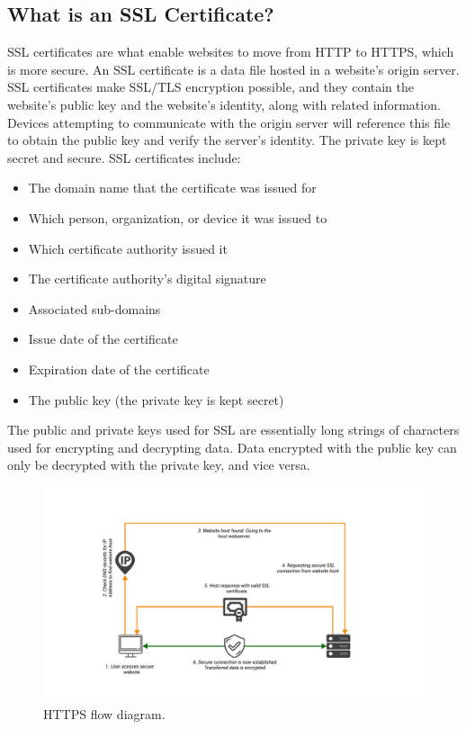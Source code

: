 \subsection{What is an SSL Certificate?}\label{subsec:what-is-an-ssl-certificate?}
SSL certificates are what enable websites to move from HTTP to HTTPS, which is more secure.
An SSL certificate is a data file hosted in a website's origin server.
SSL certificates make SSL/TLS encryption possible, and they contain the website's public key and the website's identity,
along with related information.
Devices attempting to communicate with the origin server will reference this file to obtain the public key and verify
the server's identity.
The private key is kept secret and secure.
SSL certificates include:
\begin{itemize}
    \item The domain name that the certificate was issued for
    \item Which person, organization, or device it was issued to
    \item Which certificate authority issued it
    \item The certificate authority's digital signature
    \item Associated sub-domains
    \item Issue date of the certificate
    \item Expiration date of the certificate
    \item The public key (the private key is kept secret)
\end{itemize}
The public and private keys used for SSL are essentially long strings of characters used for encrypting and decrypting data.
Data encrypted with the public key can only be decrypted with the private key, and vice versa.
\begin{figure}[H]
    \centering
    \includegraphics[width=1\textwidth]{Pictures/HTTPS_Flow}
    \caption{HTTPS flow diagram.}\label{fig:figure6}
\end{figure}

